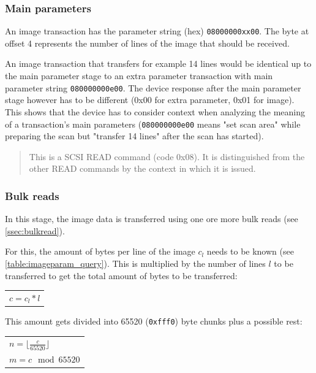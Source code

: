 \documentclass{article}
\begin{document}
\subsubsection{Main parameters}
\label{ssec:image_param}

An image transaction has the parameter string (hex) {\tt 08000000xx00}.
The byte at offset 4 represents the number of lines of the image that
should be received.

An image transaction that transfers for example 14 lines would be identical
up to the main parameter stage
to an extra parameter transaction with main parameter string {\tt 080000000e00}.
The device response after the main parameter stage however has to be different
(0x00 for extra parameter, 0x01 for image). This shows that the device has
to consider context when analyzing the meaning of a transaction's main parameters
({\tt 080000000e00} means "set scan area" while preparing the scan but
"transfer 14 lines" after the scan has started).

\blockquote[{\cite[\tt pieusb\_scancmd.c, sanei\_pieusb\_cmd\_start\_scan()]{sane_code}}]
{This is a SCSI READ command (code 0x08).
 It is distinguished from the other READ commands by the context
 in which it is issued. \\}

\subsubsection{Bulk reads}
\label{ssec:image_bulk}

In this stage, the image data is transferred using one ore more
bulk reads (see \autoref{ssec:bulkread}).

For this, the amount of bytes per line of the image $c_l$ needs to be known
(see \autoref{table:imageparam_query}). This is multiplied by the number of lines $l$ to be transferred
to get the total amount of bytes to be transferred:

\begin{center}
\begin{tabular}{l}
$ c = c_l * l $
\end{tabular}
\end{center}

This amount gets divided into 65520 ({\tt 0xfff0}) byte chunks plus a possible rest:

\begin{center}
\begin{tabular}{l}
$n = \lfloor \frac{c}{65520} \rfloor $ \\
$m = c \mod 65520$ \\
\end{tabular}
\end{center}
\end{document}
